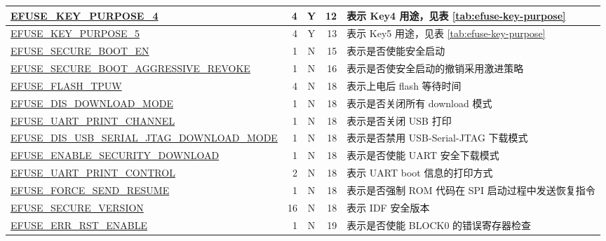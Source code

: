 \begin{longtable}[c]{ |m{8.2cm}|r|c|r|m{9.3cm}| }
    \hline
    \hyperref[fielddesc:EFUSEKEYPURPOSE4]{EFUSE\_KEY\_PURPOSE\_4} & 4 & Y & 12 & 表示 Key4 用途，见表 \ref{tab:efuse-key-purpose} \\    
    \hline
    \hyperref[fielddesc:EFUSEKEYPURPOSE5]{EFUSE\_KEY\_PURPOSE\_5} & 4 & Y & 13 & 表示 Key5 用途，见表 \ref{tab:efuse-key-purpose} \\  
    \hline
    \hyperref[fielddesc:EFUSESECUREBOOTEN]{EFUSE\_SECURE\_BOOT\_EN} & 1 & N & 15 & 表示是否使能安全启动 \\ 
    \hline
    \hyperref[fielddesc:EFUSESECUREBOOTAGGRESSIVEREVOKE]{EFUSE\_SECURE\_BOOT\_AGGRESSIVE\_REVOKE} & 1 & N & 16 & 表示是否使安全启动的撤销采用激进策略 \\
    \hline
    \hyperref[fielddesc:EFUSEFLASHTPUW]{EFUSE\_FLASH\_TPUW} & 4 & N & 18 & 表示上电后 flash 等待时间 \\    
    \hline    
    \hyperref[fielddesc:EFUSEDISDOWNLOADMODE]{EFUSE\_DIS\_DOWNLOAD\_MODE} & 1 & N & 18 & 表示是否关闭所有 download 模式\\       
    \hline
    \hyperref[fielddesc:EFUSEUSBPRINTCHANNEL]{EFUSE\_UART\_PRINT\_CHANNEL} & 1 & N & 18 & 表示是否关闭 USB 打印 \\
    \hline 
    \hyperref[fielddesc:EFUSEDISUSBDOWNLOADMODE]{EFUSE\_DIS\_USB\_SERIAL\_JTAG\_DOWNLOAD\_MODE} & 1 & N & 18 & 表示是否禁用 USB-Serial-JTAG 下载模式 \\
    \hline 
    \hyperref[fielddesc:EFUSEENABLESECURITYDOWNLOAD]{EFUSE\_ENABLE\_SECURITY\_DOWNLOAD} & 1 & N & 18 & 表示是否使能 UART 安全下载模式 \\
    \hline
    \hyperref[fielddesc:EFUSEUARTPRINTCONTROL]{EFUSE\_UART\_PRINT\_CONTROL} & 2 & N & 18 & 表示 UART boot 信息的打印方式 \\
    \hline
    \hyperref[fielddesc:EFUSEFORCESENDRESUME]{EFUSE\_FORCE\_SEND\_RESUME} & 1 & N & 18 & 表示是否强制 ROM 代码在 SPI 启动过程中发送恢复指令 \\  
    \hline
    \hyperref[fielddesc:EFUSESECUREVERSION]{EFUSE\_SECURE\_VERSION} & 16 & N & 18 & 表示 IDF 安全版本 \\\hline
    \hyperref[fielddesc:EFUSEERRRSTENABLE]{EFUSE\_ERR\_RST\_ENABLE} & 1 & N & 19 & 表示是否使能 BLOCK0 的错误寄存器检查 \\\hline
\end{longtable}
